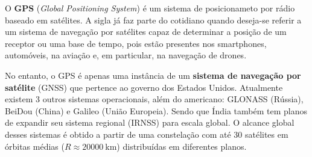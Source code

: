 \documentclass[9pt]{article}
\begin{document}


\vspace{0.3cm}


\noindent
\begin{tcolorbox}[colframe=black,width =7cm,colback=gray!20,arc=0pt]
\end{tcolorbox}

\vspace{0.3cm}

O \textbf{GPS} (\textit{Global Positioning System}) é um sistema de posicionameto por rádio baseado em satélites. A sigla já faz parte do cotidiano quando deseja-se referir a um sistema de navegação por satélites capaz de determinar a posição de um receptor ou uma base de tempo, pois estão presentes nos smartphones, automóveis, na aviação e, em particular, na navegação de drones.

No entanto, o GPS é apenas uma instância de um \textbf{sistema de navegação por satélite} (GNSS) que pertence ao governo dos Estados Unidos. Atualmente existem  3 outros sistemas operacionais, além do americano: GLONASS (Rússia), BeiDou (China) e Galileo (União Europeia). Sendo que Índia também tem planos de expandir seu sistema regional (IRNSS) para escala global. O alcance global desses sistemas é obtido a partir de uma constelação com até 30 satélites em órbitas médias ($R\approx 20000\ \text{km}$) distribuídas em diferentes planos.
\end{document}
